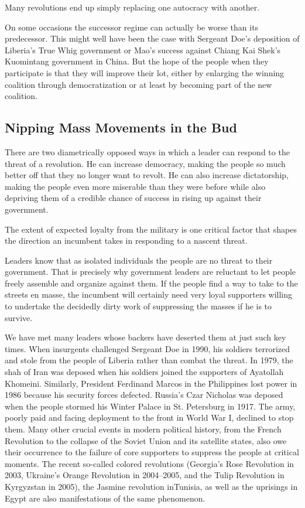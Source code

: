 \documentclass[10pt]{article}
\begin{document}
{\large Many revolutions end up simply replacing one autocracy with another.}

{\large On some occasions the successor regime can actually be worse than its
predecessor. This might well have been the case with Sergeant Doe's deposition of
Liberia's True Whig government or Mao's success against Chiang Kai Shek's
Kuomintang government in China. But the hope of the people when they participate
is that they will improve their lot, either by enlarging the winning coalition
through democratization or at least by becoming part of the new coalition.}

\subsection{Nipping Mass Movements in the Bud}

{\large There are two diametrically opposed ways in which a leader can respond
to the threat of a revolution. He can increase democracy, making the people so
much better off that they no longer want to revolt. He can also increase
dictatorship, making the people even more miserable than they were before while
also depriving them of a credible chance of success in rising up against their
government.}

{\large The extent of expected loyalty from the military is one critical factor
that shapes the direction an incumbent takes in responding to a nascent threat.}

{\large Leaders know that as isolated individuals the people are no threat to
their government. That is precisely why government leaders are reluctant to let
people freely assemble and organize against them. If the people find a way to
take to the streets en masse, the incumbent will certainly need very loyal
supporters willing to undertake the decidedly dirty work of suppressing the
masses if he is to survive.}

{\large We have met many leaders whose backers have deserted them at just such
key times. When insurgents challenged Sergeant Doe in 1990, his soldiers
terrorized and stole from the people of Liberia rather than combat the threat. In
1979, the shah of Iran was deposed when his soldiers joined the supporters of
Ayatollah Khomeini. Similarly, President Ferdinand Marcos in the Philippines lost
power in 1986 because his security forces defected. Russia's Czar Nicholas was
deposed when the people stormed his Winter Palace in St. Petersburg in 1917. The
army, poorly paid and facing deployment to the front in World War I, declined to
stop them. Many other crucial events in modern political history, from the French
Revolution to the collapse of the Soviet Union and its satellite states, also owe
their occurrence to the failure of core supporters to suppress the people at
critical moments. The recent so-called colored revolutions (Georgia's Rose
Revolution in 2003, Ukraine's Orange Revolution in 2004--2005, and the Tulip
Revolution in Kyrgyzstan in 2005), the Jasmine revolution inTunisia, as well as
the uprisings in Egypt are also manifestations of the same phenomenon.}
\end{document}
